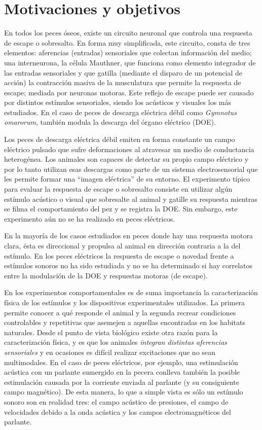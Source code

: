 \documentclass[12pt, a4paper, twoside]{report}
\begin{document}

\chapter*{Motivaciones y objetivos}
En todos los peces óseos, existe un circuito neuronal que controla una respuesta de escape o sobresalto. En forma muy simplificada, este circuito, consta de tres elementos: aferencias (entradas) sensoriales que colectan información del medio; una interneurona, la célula Mauthner, que funciona como elemento integrador de las entradas sensoriales y que gatilla (mediante el disparo de un potencial de acción) la contracción masiva de la musculatura que permite la respuesta de escape; mediada por neuronas motoras. Este reflejo de escape puede ser causado por distintos estímulos sensoriales, siendo los acústicos y visuales los más estudiados. En el caso de peces de descarga eléctrica débil como \emph{Gymnotus omarorum}, también modula la descarga del órgano eléctrico (DOE).

Los peces de descarga eléctrica débil emiten en forma constante un campo eléctrico pulsado que sufre deformaciones al atravesar un medio de conductancia heterogénea. Los animales son capaces de detectar su propio campo eléctrico y por lo tanto utilizan esas descargas como parte de un sistema electrosensorial que les permite formar una ``imagen eléctrica'' de su entorno. El experimento típico para evaluar la respuesta de escape o sobresalto consiste en utilizar algún estímulo acústico o visual que sobresalte al animal y gatille su respuesta mientras se filma el comportamiento del pez y se registra la DOE. Sin embargo, este experimento aún no se ha realizado en peces eléctricos.

En la mayoría de los casos estudiados en peces donde hay una respuesta motora clara, ésta es direccional y propulsa al animal en dirección contraria a la del estímulo. En los peces eléctricos la respuesta de escape o novedad frente a estímulos sonoros no ha sido estudiada y no se ha determinado si hay correlatos entre la modulación de la DOE y respuestas motoras (de escape).

En los experimentos comportamentales es de suma importancia la caracterización física de los estímulos y los dispositivos experimentales utilizados. La primera permite conocer a qué responde el animal y la segunda recrear condiciones controlables y repetitivas que asemejen a aquellas encontradas en los habitats naturales. Desde el punto de vista biológico existe otra razón para la caracterización física, y es que los animales \emph{integran distintas aferencias sensoriales} y en ocasiones es difícil realizar excitaciones que no sean multimodales. En el caso de peces eléctricos, por ejemplo, una estimulación acústica con un parlante sumergido en la pecera conlleva también la posible estimulación causada por la corriente enviada al parlante (y su consiguiente campo magnético). De esta manera, lo que a simple vista es sólo un estímulo sonoro son en realidad tres: el campo acústico de presiones, el campo de velocidades debido a la onda acústica y los campos electromagnéticos del parlante.
\end{document}
